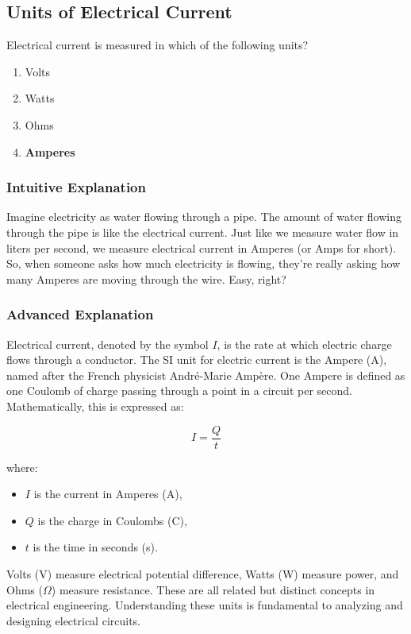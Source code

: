\subsection{Units of Electrical Current}
\label{T5A01}

\begin{tcolorbox}[colback=gray!10!white,colframe=black!75!black,title=T5A01]
Electrical current is measured in which of the following units?
\begin{enumerate}[label=\Alph*)]
    \item Volts
    \item Watts
    \item Ohms
    \item \textbf{Amperes}
\end{enumerate}
\end{tcolorbox}

\subsubsection*{Intuitive Explanation}
Imagine electricity as water flowing through a pipe. The amount of water flowing through the pipe is like the electrical current. Just like we measure water flow in liters per second, we measure electrical current in Amperes (or Amps for short). So, when someone asks how much electricity is flowing, they're really asking how many Amperes are moving through the wire. Easy, right?

\subsubsection*{Advanced Explanation}
Electrical current, denoted by the symbol \( I \), is the rate at which electric charge flows through a conductor. The SI unit for electric current is the Ampere (A), named after the French physicist André-Marie Ampère. One Ampere is defined as one Coulomb of charge passing through a point in a circuit per second. Mathematically, this is expressed as:

\[
I = \frac{Q}{t}
\]

where:
\begin{itemize}
    \item \( I \) is the current in Amperes (A),
    \item \( Q \) is the charge in Coulombs (C),
    \item \( t \) is the time in seconds (s).
\end{itemize}

Volts (V) measure electrical potential difference, Watts (W) measure power, and Ohms (\(\Omega\)) measure resistance. These are all related but distinct concepts in electrical engineering. Understanding these units is fundamental to analyzing and designing electrical circuits.

